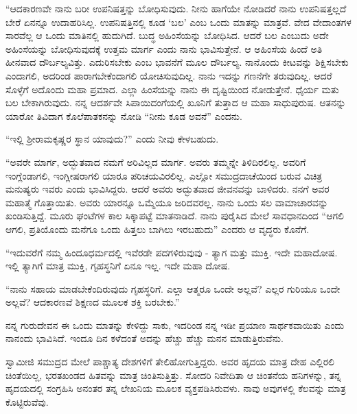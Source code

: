 “ಆದಕಾರಣವೇ ನಾನು ಬರೀ ಉಪನಿಷತ್ತನ್ನು ಬೋಧಿಸುವುದು. ನೀನು ಹಾಗೆಯೇ ನೋಡಿದರೆ ನಾನು ಉಪನಿಷತ್ತಲ್ಲದೆ ಬೇರೆ ಏನನ್ನೂ ಉದಾಹರಿಸಿಲ್ಲ. ಉಪನಿಷತ್ತಿನಲ್ಲಿ ಕೂಡ ‘ಬಲ’ ಎಂಬ ಒಂದು ಮಾತನ್ನು ಮಾತ್ರವೆ. ವೇದ ವೇದಾಂತಗಳ ಸಾರವೆಲ್ಲ ಆ ಒಂದು ಮಾತಿನಲ್ಲಿ ಹುದುಗಿದೆ. ಬುದ್ಧ ಅಹಿಂಸೆಯನ್ನು ಬೋಧಿಸಿದ. ಆದರೆ ಬಲ ಎಂಬುದು ಅದೇ ಅಹಿಂಸೆಯನ್ನು ಬೋಧಿಸುವುದಕ್ಕೆ ಉತ್ತಮ ಮಾರ್ಗ ಎಂದು ನಾನು ಭಾವಿಸುತ್ತೇನೆ. ಆ ಅಹಿಂಸೆಯ ಹಿಂದೆ ಅತಿ ಹೀನವಾದ ದೌರ್ಬಲ್ಯವಿತ್ತು. ಎದುರಿಸಬೇಕು ಎಂಬ ಭಾವನೆಗೆ ಮೂಲ ದೌರ್ಬಲ್ಯ. ನಾನೊಂದು ಕೀಟವನ್ನು ಶಿಕ್ಷಿಸಬೇಕು ಎಂದಾಗಲಿ, ಅದರಿಂಡ ಪಾರಾಗಬೇಕೆಂದಾಗಲಿ ಯೋಚಿಸುವುದಿಲ್ಲ. ನಾನು ಇದನ್ನು ಗಣನೆಗೇ ತರುವುದಿಲ್ಲ. ಆದರೆ ಸೊಳ್ಳೆಗೆ ಅದೊಂದು ಮಹಾ ಪ್ರಮಾದ. ಎಲ್ಲಾ ಹಿಂಸೆಯನ್ನು ನಾನು ಈ ದೃಷ್ಟಿಯಿಂದ ನೋಡುತ್ತೇನೆ. ಧೈರ್ಯ ಮತು ಬಲ ಬೇಕಾಗಿರುವುದು. ನನ್ನ ಆದರ್ಶವೇ ಸಿಪಾಯಿದಂಗೆಯಲ್ಲಿ ಖೂನಿಗೆ ತುತ್ತಾದ ಆ ಮಹಾ ಸಾಧುಪುರುಷ. ಆತನನ್ನು ಯಾರೋ ತಿವಿದಾಗ ಕೊಲೆಪಾತಕನನ್ನು ನೋಡಿ “ನೀನು ಕೂಡ ಅವನೆ” ಎಂದನು. 

 “ಇಲ್ಲಿ ಶ‍್ರೀರಾಮಕೃಷ್ಣರ ಸ್ಥಾನ ಯಾವುದು?” ಎಂದು ನೀವು ಕೇಳಬಹುದು. 

 “ಅವರೇ ಮಾರ್ಗ, ಅದ್ಭುತವಾದ ನಮಗೆ ಅರಿವಿಲ್ಲದ ಮಾರ್ಗ. ಅವರು ತಮ್ಮನ್ನೇ ತಿಳಿದಿರಲಿಲ್ಲ. ಅವರಿಗೆ ಇಂಗ್ಲೆಂಡಾಗಲಿ, ಇಂಗ್ಲೀಷರಾಗಲಿ ಯಾರೂ ಪರಿಚಯವಿರಲಿಲ್ಲ. ಎಲ್ಲೋ ಸಮುದ್ರದಾಚೆಯಿಂದ ಬರುವ ವಿಚಿತ್ರ ಮನುಷ್ಯರು ಇವರು ಎಂದು ಭಾವಿಸಿದ್ದರು. ಆದರೆ ಅವರು ಅದ್ಭುತವಾದ ಜೀವನವನ್ನು ಬಾಳಿದರು. ನನಗೆ ಅವರ ಮಹಾತ್ಮೆ ಗೊತ್ತಾಯಿತು. ಅವರು ಯಾರನ್ನೂ ಒಮ್ಮೆಯೂ ಜರಿದವರಲ್ಲ. ನಾನು ಒಂದು ಸಲ ವಾಮಾಚಾರವನ್ನು ಖಂಡಿಸುತ್ತಿದ್ದೆ. ಮೂರು ಘಂಟೆಗಳ ಕಾಲ ಸಿಕ್ಕಾಪಟ್ಟೆ ಮಾತನಾಡಿದೆ. ನಾನು ಪುರೈಸಿದ ಮೇಲೆ ಸಾವಧಾನದಿಂದ “ಆಗಲಿ ಆಗಲಿ, ಪ್ರತಿಯೊಂದು ಮನೆಗೂ ಒಂದು ಹಿತ್ತಲು ಬಾಗಿಲು ಇರಬಹುದು” ಎಂದರು ಆ ವೃದ್ಧರು ಕೊನೆಗೆ. 

 “ಇದುವರೆಗೆ ನಮ್ಮ ಹಿಂದೂಧರ್ಮದಲ್ಲಿ ಇವೆರಡೇ ಪದಗಳಿರುವುವು - ತ್ಯಾಗ ಮತ್ತು ಮುಕ್ತಿ. ಇದೇ ಮಹಾದೋಷ. ಇಲ್ಲಿ ತ್ಯಾಗಿಗೆ ಮಾತ್ರ ಮುಕ್ತಿ, ಗೃಹಸ್ಥನಿಗೆ ಏನೂ ಇಲ್ಲ. ಇದೇ ಮಹಾ ದೋಷ. 

 “ನಾನು ಸಹಾಯ ಮಾಡಬೇಕೆಂದಿರುವುದು ಗೃಹಸ್ಥರಿಗೆ. ಎಲ್ಲಾ ಆತ್ಮರೂ ಒಂದೇ ಅಲ್ಲವೆ? ಎಲ್ಲರ ಗುರಿಯೂ ಒಂದೇ ಅಲ್ಲವೆ? ಆದಕಾರಣವೆ ಶಿಕ್ಷಣದ ಮೂಲಕ ಶಕ್ತಿ ಬರಬೇಕು.” 

 ನನ್ನ ಗುರುದೇವನ ಈ ಒಂದು ಮಾತನ್ನು ಕೇಳಿದ್ದು ಸಾಕು, ಇದರಿಂಡ ನನ್ನ ಇಡೀ ಪ್ರಯಾಣ ಸಾರ್ಥಕವಾಯಿತು ಎಂದು ನಾನಂದು ಭಾವಿಸಿದೆ. ಇಂದೂ ದಿನ ಕಳೆದಂತೆ ಅದನ್ನು ಹೆಚ್ಚು ಹೆಚ್ಚು ಮನನ ಮಾಡುತ್ತಿರುವೆನು. 

\delimiter

 ಸ್ವಾಮೀಜಿ ಸಮುದ್ರದ ಮೇಲೆ ಪಾಶ್ಚಾತ್ಯ ದೇಶಗಳಿಗೆ ತೇಲಿಹೋಗುತ್ತಿದ್ದರು. ಅವರ ಹೃದಯ ಮಾತ್ರ ದೇಹ ಎಲ್ಲಿರಲಿ ಚಿಂತೆಯಿಲ್ಲ, ಭರತಖಂಡದ ಹಿತವನ್ನು ಮಾತ್ರ ಚಿಂತಿಸುತ್ತಿತ್ತು. ಸೋದರಿ ನಿವೇದಿತಾ ಆ ಚಿಂತನೆಯ ಹನಿಗಳನ್ನು, ತನ್ನ ಹೃದಯದಲ್ಲಿ ಸಂಗ್ರಹಿಸಿ ಅನಂತರ ತನ್ನ ಲೇಖನಿಯ ಮೂಲಕ ವ್ಯಕ್ತಪಡಿಸಿರುವಳು. ನಾವು ಅವುಗಳಲ್ಲಿ ಕೆಲವನ್ನು ಮಾತ್ರ ಕೊಟ್ಟಿರುವೆವು.

